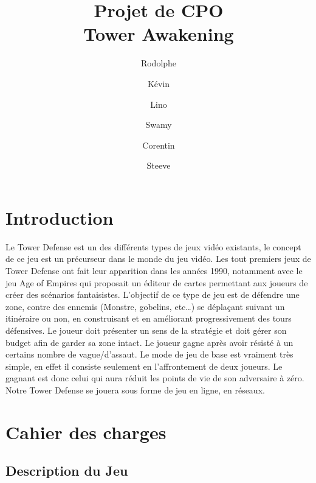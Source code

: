 \documentclass[12pt, letterpaper]{article}
\author{Rodolphe \bsc{CARGNELLO}
\and Kévin \bsc{VINCHON}
\and Lino \bsc{TULLIEZ}
\and \hspace{5mm}Swamy \bsc{CANDASSAMY}
\and Corentin \bsc{FILOCHE}
\and Steeve \bsc{VINCENT}}
\title{\textbf{Projet de CPO \\ Tower Awakening}}
\begin{document}
{\selectfont
\maketitle
\tableofcontents
\BgThispage
\BgThispage
\section{Introduction}
	Le Tower Defense est un des différents types de jeux vidéo existants, le concept de ce jeu est un précurseur dans le monde du jeu vidéo. Les tout premiers jeux de Tower Defense ont fait leur apparition dans les années 1990, notamment avec le jeu Age of Empires qui proposait un éditeur de cartes permettant aux joueurs de créer des scénarios fantaisistes.
L’objectif de ce type de jeu est de défendre une zone, contre des ennemis (Monstre, gobelins, etc…) se déplaçant suivant un itinéraire ou non, en construisant et en améliorant progressivement des tours défensives. Le joueur doit présenter un sens de la stratégie et doit gérer son budget afin de garder sa zone intact. Le joueur gagne après avoir résisté à un certains nombre de vague/d'assaut.
Le mode de jeu de base est vraiment très simple, en effet il consiste seulement en l’affrontement de deux joueurs. Le gagnant est donc celui qui aura réduit les points de vie de son adversaire à zéro. Notre Tower Defense se jouera sous forme de jeu en ligne, en réseaux.

\section{Cahier des charges}
\subsection{Description du Jeu}

}
\end{document}
